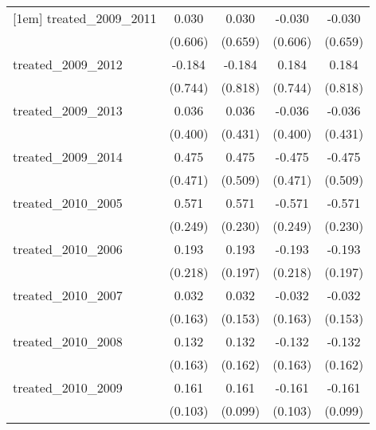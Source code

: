 {\begin{tabular}{l*{4}{c}}
[1em]
treated\_2009\_2011&       0.030         &       0.030         &      -0.030         &      -0.030         \\
            &     (0.606)         &     (0.659)         &     (0.606)         &     (0.659)         \\
[1em]
treated\_2009\_2012&      -0.184         &      -0.184         &       0.184         &       0.184         \\
            &     (0.744)         &     (0.818)         &     (0.744)         &     (0.818)         \\
[1em]
treated\_2009\_2013&       0.036         &       0.036         &      -0.036         &      -0.036         \\
            &     (0.400)         &     (0.431)         &     (0.400)         &     (0.431)         \\
[1em]
treated\_2009\_2014&       0.475         &       0.475         &      -0.475         &      -0.475         \\
            &     (0.471)         &     (0.509)         &     (0.471)         &     (0.509)         \\
[1em]
treated\_2010\_2005&       0.571\sym{*}  &       0.571\sym{*}  &      -0.571\sym{*}  &      -0.571\sym{*}  \\
            &     (0.249)         &     (0.230)         &     (0.249)         &     (0.230)         \\
[1em]
treated\_2010\_2006&       0.193         &       0.193         &      -0.193         &      -0.193         \\
            &     (0.218)         &     (0.197)         &     (0.218)         &     (0.197)         \\
[1em]
treated\_2010\_2007&       0.032         &       0.032         &      -0.032         &      -0.032         \\
            &     (0.163)         &     (0.153)         &     (0.163)         &     (0.153)         \\
[1em]
treated\_2010\_2008&       0.132         &       0.132         &      -0.132         &      -0.132         \\
            &     (0.163)         &     (0.162)         &     (0.163)         &     (0.162)         \\
[1em]
treated\_2010\_2009&       0.161         &       0.161         &      -0.161         &      -0.161         \\
            &     (0.103)         &     (0.099)         &     (0.103)         &     (0.099)         \\

\end{tabular}}
